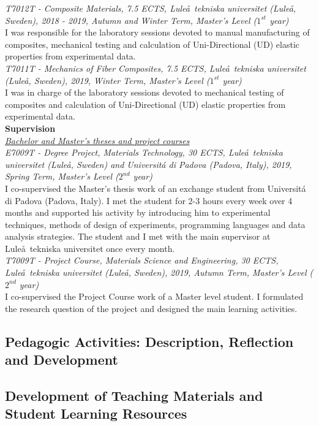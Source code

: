 \documentclass[
  a4paper, 
]{fortysecondscv}
\begin{document}
\textit{T7012T - Composite Materials, 7.5 ECTS, Lule\aa\ tekniska universitet (Lule\aa, Sweden), 2018 - 2019, Autumn and Winter Term, Master's Level ($1^{st}$ year)}\\
I was responsible for the laboratory sessions devoted to manual manufacturing of composites, mechanical testing and calculation of Uni-Directional (UD) elastic properties from experimental data.\\[6pt]
\textit{T7011T - Mechanics of Fiber Composites, 7.5 ECTS, Lule\aa\ tekniska universitet (Lule\aa, Sweden), 2019, Winter Term, Master's Level ($1^{st}$ year)}\\
I was in charge of the laboratory sessions devoted to mechanical testing of composites and calculation of Uni-Directional (UD) elastic properties from experimental data.\\[6pt]
\textbf{Supervision}\\[6pt]
\underline{\emph{Bachelor and Master's theses and project courses}}\\[6pt]
\textit{E7009T - Degree Project, Materials Technology, 30 ECTS, Lule\aa\ tekniska universitet (Lule\aa, Sweden) and Universit\'a di Padova (Padova, Italy), 2019, Spring Term, Master's Level ($2^{nd}$ year)}\\
I co-supervised the Master's thesis work of an exchange student from Universit\'a di Padova (Padova, Italy). I met the student for 2-3 hours every week over 4 months and supported his activity by introducing him to experimental techniques, methods of design of experiments, programming languages and data analysis strategies. The student and I met with the main supervisor at Lule\aa\ tekniska universitet once every month.\\[6pt]
\textit{T7009T - Project Course, Materials Science and Engineering, 30 ECTS, Lule\aa\ tekniska universitet (Lule\aa, Sweden), 2019, Autumn Term, Master's Level ($2^{nd}$ year)}\\
I co-supervised the Project Course work of a Master level student. I formulated the research question of the project and designed the main learning activities.\\

\subsection{Pedagogic Activities: Description, Reflection and Development}

\subsection{Development of Teaching Materials and Student Learning Resources}
\end{document}
